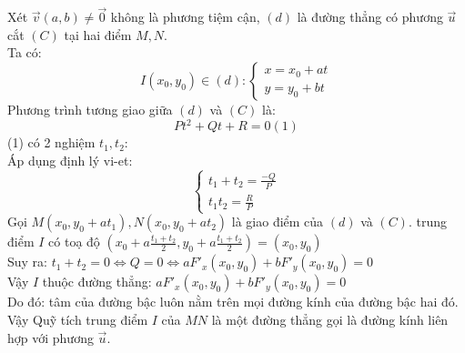 \documentclass[12pt,a4]{article}
\begin{document}
\begin{titlepage}
\begin{center}
    \end{center}
    Xét $\vec{v}(a,b) \neq \vec{0}$ không là phương tiệm cận, $(d)$ là đường thẳng có phương $\vec{u}$ cắt $(C)$ tại hai điểm $M,N.$\\
    Ta có:
    \[
    I(x_0,y_0) \in (d): \begin{cases}x = x_0 + at \\ y = y_0 + bt \end{cases}
    \]
    Phương trình tương giao giữa $(d)$ và $(C)$ là: 
    \[
    Pt^2 + Qt + R = 0 (1)
    \]
    (1) có 2 nghiệm $t_1, t_2$:\\
    Áp dụng định lý vi-et:
    \[
    \begin{cases}  t_1 + t_2 = \frac{-Q}{P} \\ t_1t_2 = \frac{R}{P}\end{cases}
    \]
    Gọi $M(x_0,y_0 + at_1), N(x_0,y_0 + at_2)$ là giao điểm của $(d)$ và $(C)$. trung điểm $I$ có toạ độ $(x_0 + a\frac{t_1 + t_2}{2}, y_0 + a \frac{t_1 + t_2}{2}) = (x_0, y_0)$\\
    Suy ra: $t_1 + t_2 = 0 \Leftrightarrow Q = 0\Leftrightarrow aF'_x(x_0,y_0) + bF'_y(x_0,y_0) = 0$\\
    Vậy $I$ thuộc đường thẳng: $aF'_x(x_0,y_0) + bF'_y(x_0,y_0) = 0$\\
    Do đó: tâm của đường bậc luôn nằm trên mọi đường kính của đường bậc hai đó.\\
    Vậy Quỹ tích trung điểm $I$ của $MN$ là một đường thẳng gọi là đường kính liên hợp với phương $\vec{u}$.

\end{titlepage}
\end{document}
